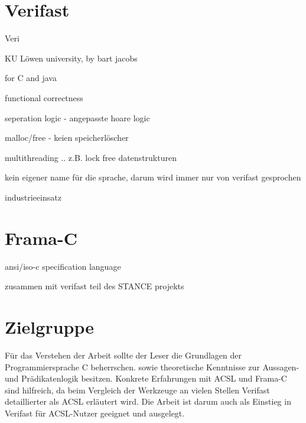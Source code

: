 \section{Verifast}
\label{sec:verifast}

Veri

KU Löwen university, by bart jacobs


for C and java


functional correctness


seperation logic - angepasste hoare logic


malloc/free - keien speicherlöscher


multithreading .. z.B. lock free datenstrukturen

kein eigener name für die sprache, darum wird immer nur von verifast gesprochen


industrieeinsatz

\section{Frama-C}
\label{acsl-und-frama-c}

ansi/iso-c specification language


zusammen mit verifast teil des STANCE projekts

\section{Zielgruppe}
\label{sec:zielgruppe}

Für das Verstehen der Arbeit sollte der Leser die Grundlagen der Programmiersprache C beherrschen.
sowie theoretische Kenntnisse zur Aussagen- und Prädikatenlogik besitzen.
Konkrete Erfahrungen mit ACSL und Frama-C sind hilfreich, da beim Vergleich der Werkzeuge an vielen
Stellen Verifast detaillierter als ACSL erläutert wird. Die Arbeit ist darum auch als Einstieg in Verifast
für ACSL-Nutzer geeignet und ausgelegt.

 

